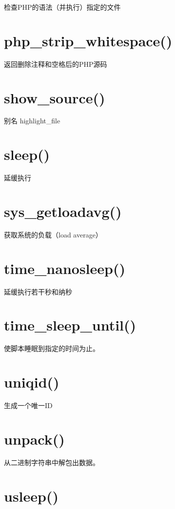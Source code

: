检查PHP的语法（并执行）指定的文件

\section{php\_strip\_whitespace()}

返回删除注释和空格后的PHP源码

\section{show\_source()}

别名 highlight\_file

\section{sleep()}

延缓执行

\section{sys\_getloadavg()}

获取系统的负载（load average）

\section{time\_nanosleep()}

延缓执行若干秒和纳秒

\section{time\_sleep\_until()}

使脚本睡眠到指定的时间为止。

\section{uniqid()}

生成一个唯一ID

\section{unpack()}

从二进制字符串中解包出数据。

\section{usleep()}

